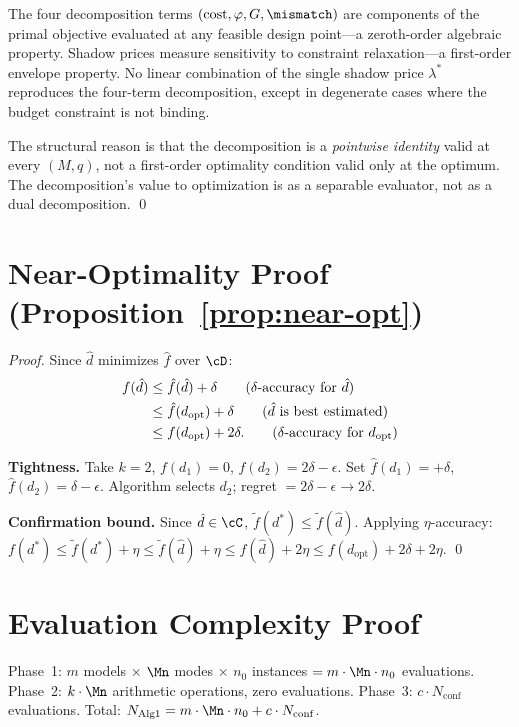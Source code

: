 The four decomposition terms $(\text{cost}, \varphi, G, \mismatch)$ are
components of the primal objective evaluated at any feasible design
point---a zeroth-order algebraic property.  Shadow prices measure
sensitivity to constraint relaxation---a first-order envelope property.
No linear combination of the single shadow price $\lambda^*$ reproduces
the four-term decomposition, except in degenerate cases where the budget
constraint is not binding.

The structural reason is that the decomposition is a \emph{pointwise
identity} valid at every $(M, q)$, not a first-order optimality condition
valid only at the optimum.  The decomposition's value to optimization is
as a separable evaluator, not as a dual decomposition. \qed

\section{Near-Optimality Proof (Proposition~\ref{prop:near-opt})}
\label{app:near-opt}

\begin{proof}
Since $\hat{d}$ minimizes $\hat{f}$ over $\cD$:
\begin{align}
  f(\hat{d})
  &\le \hat{f}(\hat{d}) + \delta
    \tag{$\delta$-accuracy for $\hat{d}$} \\
  &\le \hat{f}(d_{\mathrm{opt}}) + \delta
    \tag{$\hat{d}$ is best estimated} \\
  &\le f(d_{\mathrm{opt}}) + 2\delta.
    \tag{$\delta$-accuracy for $d_{\mathrm{opt}}$}
\end{align}

\textbf{Tightness.}
Take $k{=}2$, $f(d_1) = 0$, $f(d_2) = 2\delta - \epsilon$.
Set $\hat{f}(d_1) = +\delta$, $\hat{f}(d_2) = \delta - \epsilon$.
Algorithm selects $d_2$; regret $= 2\delta - \epsilon \to 2\delta$.

\textbf{Confirmation bound.}
Since $\hat{d} \in \cC$, $\tilde{f}(d^*) \le \tilde{f}(\hat{d})$.
Applying $\eta$-accuracy:
$f(d^*) \le \tilde{f}(d^*) + \eta \le \tilde{f}(\hat{d}) + \eta
\le f(\hat{d}) + 2\eta \le f(d_{\mathrm{opt}}) + 2\delta + 2\eta$. \qed
\end{proof}

\section{Evaluation Complexity Proof}
\label{app:eval-complexity}

Phase~1: $m$ models $\times$ $\Mn$ modes $\times$ $n_0$ instances
$= m \cdot \Mn \cdot n_0$ evaluations.
Phase~2: $k \cdot \Mn$ arithmetic operations, zero evaluations.
Phase~3: $c \cdot N_{\mathrm{conf}}$ evaluations.
Total: $N_{\mathrm{Alg1}} = m \cdot \Mn \cdot n_0 + c \cdot N_{\mathrm{conf}}$.


